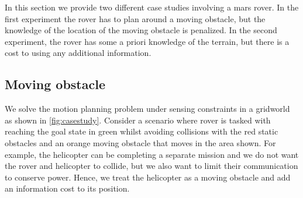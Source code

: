 In this section we provide two different case studies involving a mars rover. In the first experiment the rover has to plan around a moving obstacle, but the knowledge of the location of the moving obstacle is penalized. In the second experiment, the rover has some a priori knowledge of the terrain, but there is a cost to using any additional information. 

\subsection{Moving obstacle}
We solve the motion planning problem under sensing constraints in a gridworld as shown in \ref{fig:casestudy}. Consider a scenario where rover is tasked with reaching the goal state in green whilst avoiding collisions with the red static obstacles and an orange moving obstacle that moves in the area shown. For example, the helicopter can be completing a separate mission and we do not want the rover and helicopter to collide, but we also want to limit their communication to conserve power. Hence, we treat the helicopter as a moving obstacle and add an information cost to its position.

